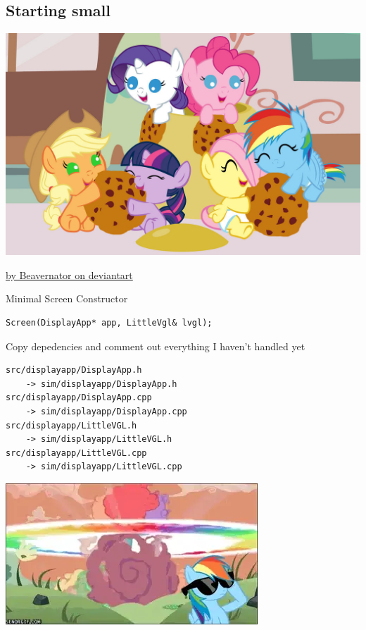 \documentclass{beamer}
\begin{document}
\subsection{Starting small}
\begin{frame}{}
  \includegraphics[width=\textwidth]{../pony_cookie_jar_raid_by_beavernator}

  \small \href{https://www.deviantart.com/beavernator/art/Cookie-Jar-Raid-362413620}{by Beavernator on deviantart}
\end{frame}


\begin{frame}[fragile]{}

  Minimal Screen Constructor
  \begin{verbatim}
Screen(DisplayApp* app, LittleVgl& lvgl);
  \end{verbatim}

  Copy depedencies and comment out everything I haven't handled yet

  \begin{verbatim}
src/displayapp/DisplayApp.h
    -> sim/displayapp/DisplayApp.h
src/displayapp/DisplayApp.cpp
    -> sim/displayapp/DisplayApp.cpp
src/displayapp/LittleVGL.h
    -> sim/displayapp/LittleVGL.h
src/displayapp/LittleVGL.cpp
    -> sim/displayapp/LittleVGL.cpp
  \end{verbatim}
\end{frame}

\begin{frame}{}
  \includegraphics[width=\textwidth]{../rainboom-0}
\end{frame}
\end{document}
